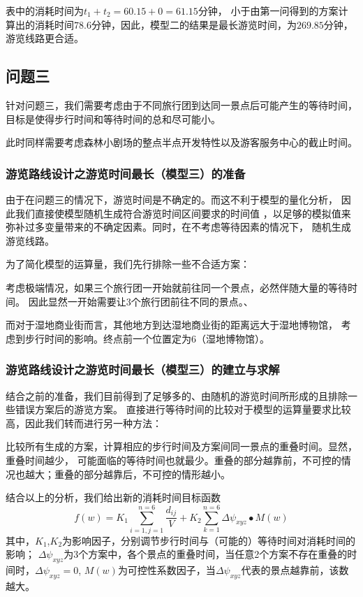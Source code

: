 \documentclass[hyperref,UTF8]{article}
\begin{document}
{表中的消耗时间为$t_1+t_2=60.15+0=61.15$分钟，
小于由第一问得到的方案计算出的消耗时间$78.6$分钟，因此，模型二的结果是最长游览时间，为$269.85$分钟，游览线路更合适。

\subsection{问题三}
针对问题三，我们需要考虑由于不同旅行团到达同一景点后可能产生的等待时间，
目标是使得步行时间和等待时间的总和尽可能小。

此时同样需要考虑森林小剧场的整点半点开发特性以及游客服务中心的截止时间。
\subsubsection{游览路线设计之游览时间最长（模型三）的准备}
由于在问题三的情况下，游览时间是不确定的。而这不利于模型的量化分析，
因此我们直接使模型随机生成符合游览时间区间要求的时间值
，以足够的模拟值来弥补过多变量带来的不确定因素。同时，在不考虑等待因素的情况下，
随机生成游览线路。

为了简化模型的运算量，我们先行排除一些不合适方案：

考虑极端情况，如果三个旅行团一开始就前往同一个景点，必然伴随大量的等待时间。
因此显然一开始需要让3个旅行团前往不同的景点。、

而对于湿地商业街而言，其他地方到达湿地商业街的距离远大于湿地博物馆，
考虑到步行时间的影响。终点前一个位置定为6（湿地博物馆）。

\subsubsection{游览路线设计之游览时间最长（模型三）的建立与求解}
结合之前的准备，我们目前得到了足够多的、由随机的游览时间所形成的且排除一些错误方案后的游览方案。
直接进行等待时间的比较对于模型的运算量要求比较高，因此我们转而进行另一种方法：

比较所有生成的方案，计算相应的步行时间及方案间同一景点的重叠时间。显然，重叠时间越少，
可能面临的等待时间也就最少。重叠的部分越靠前，不可控的情况也越大；重叠的部分越靠后，不可控的情形越小。

结合以上的分析，我们给出新的消耗时间目标函数
\begin{equation}\label{wenti21}
f(w)=K_1\sum_{i=1,j=1}^{n=6}\frac{ d_{ij}}{V}+K_2\sum_{k=1}^{n=6}\Delta {\psi}_{xyz}\bullet M(w)
\end{equation}
其中，$K_1$,$K_2$为影响因子，分别调节步行时间与（可能的）等待时间对消耗时间的影响；
$\Delta {\psi}_{xyz}$为3个方案中，各个景点的重叠时间，当任意2个方案不存在重叠的时间时，$\Delta {\psi}_{xyz}=0$,
$M(w)$为可控性系数因子，当$\Delta {\psi}_{xyz}$代表的景点越靠前，该数越大。

}
\end{document}
